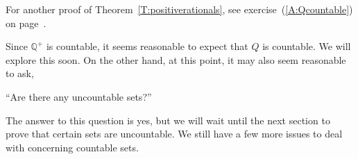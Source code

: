 \newpar
\note For another proof of Theorem~\ref{T:positiverationals}, see exercise~(\ref{A:Qcountable}) on page~\pageref{A:Qcountable}.

\newpar
Since $\mathbb{Q}^+$ is countable, it seems reasonable to expect that $Q$ is countable.  We will explore this soon.  On the other hand, at this point, it may also seem reasonable to ask, 
\begin{center}
``Are there any uncountable sets?''
\end{center}
The answer to this question is yes, but we will wait until the next section to prove that certain sets are uncountable.  We still have a few more issues to deal with concerning countable sets.
\endinput
